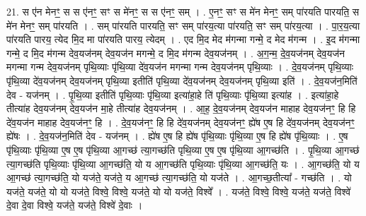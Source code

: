 \documentclass[17pt]{extarticle}
\begin{document}
21. स ए॑न मेनꣳ॒॒ स स ए॑नꣳ॒॒ सꣳ स मे॑नꣳ॒॒ स स ए॑नꣳ॒॒ सम् । . ए॒नꣳ॒॒ सꣳ स मे॑न मेनꣳ॒॒ सम् पा॑रयति पारयति॒ स मे॑न मेनꣳ॒॒ सम् पा॑रयति । . सम् पा॑रयति पारयति॒ सꣳ सम् पा॑रय॒त्या पा॑रयति॒ सꣳ सम् पा॑रय॒त्या । . पा॒र॒य॒त्या पा॑रयति पारय॒ त्येद मि॒द मा पा॑रयति पारय॒ त्येदम् । . एद मि॒द मेद म॑गन्मा गन्मे॒ द मेद म॑गन्म । . इ॒द म॑गन्मा गन्मे॒ द मि॒द म॑गन्म देव॒यज॑नम् देव॒यज॑न मगन्मे॒ द मि॒द म॑गन्म देव॒यज॑नम् । . अ॒ग॒न्म॒ दे॒व॒यज॑नम् देव॒यज॑न मगन्मा गन्म देव॒यज॑नम् पृथि॒व्याः पृ॑थि॒व्या दे॑व॒यज॑न मगन्मा गन्म देव॒यज॑नम् पृथि॒व्याः । . दे॒व॒यज॑नम् पृथि॒व्याः पृ॑थि॒व्या दे॑व॒यज॑नम् देव॒यज॑नम् पृथि॒व्या इतीति॑ पृथि॒व्या दे॑व॒यज॑नम् देव॒यज॑नम् पृथि॒व्या इति॑ । . दे॒व॒यज॑न॒मिति॑ देव - यज॑नम् । . पृ॒थि॒व्या इतीति॑ पृथि॒व्याः पृ॑थि॒व्या इत्या॑हा॒हे ति॑ पृथि॒व्याः पृ॑थि॒व्या इत्या॑ह । . इत्या॑हा॒हे तीत्या॑ह देव॒यज॑नम् देव॒यज॑न मा॒हे तीत्या॑ह देव॒यज॑नम् । . आ॒ह॒ दे॒व॒यज॑नम् देव॒यज॑न माहाह देव॒यज॑नꣳ॒॒ हि हि दे॑व॒यज॑न माहाह देव॒यज॑नꣳ॒॒ हि । . दे॒व॒यज॑नꣳ॒॒ हि हि दे॑व॒यज॑नम् देव॒यज॑नꣳ॒॒ ह्ये॑ष ए॒ष हि दे॑व॒यज॑नम् देव॒यज॑नꣳ॒॒ ह्ये॑षः । . दे॒व॒यज॑न॒मिति॑ देव - यज॑नम् । . ह्ये॑ष ए॒ष हि ह्ये॑ष पृ॑थि॒व्याः पृ॑थि॒व्या ए॒ष हि ह्ये॑ष पृ॑थि॒व्याः । . ए॒ष पृ॑थि॒व्याः पृ॑थि॒व्या ए॒ष ए॒ष पृ॑थि॒व्या आ॒गच्छ॑ त्या॒गच्छ॑ति पृथि॒व्या ए॒ष ए॒ष पृ॑थि॒व्या आ॒गच्छ॑ति । . पृ॒थि॒व्या आ॒गच्छ॑ त्या॒गच्छ॑ति पृथि॒व्याः पृ॑थि॒व्या आ॒गच्छ॑ति॒ यो य आ॒गच्छ॑ति पृथि॒व्याः पृ॑थि॒व्या आ॒गच्छ॑ति॒ यः । . आ॒गच्छ॑ति॒ यो य आ॒गच्छ॑ त्या॒गच्छ॑ति॒ यो यज॑ते॒ यज॑ते॒ य आ॒गच्छ॑ त्या॒गच्छ॑ति॒ यो यज॑ते । . आ॒गच्छ॒तीत्या᳚ - गच्छ॑ति । . यो यज॑ते॒ यज॑ते॒ यो यो यज॑ते॒ विश्वे॒ विश्वे॒ यज॑ते॒ यो यो यज॑ते॒ विश्वे᳚ । . यज॑ते॒ विश्वे॒ विश्वे॒ यज॑ते॒ यज॑ते॒ विश्वे॑ दे॒वा दे॒वा विश्वे॒ यज॑ते॒ यज॑ते॒ विश्वे॑ दे॒वाः । \newline
\end{document}
